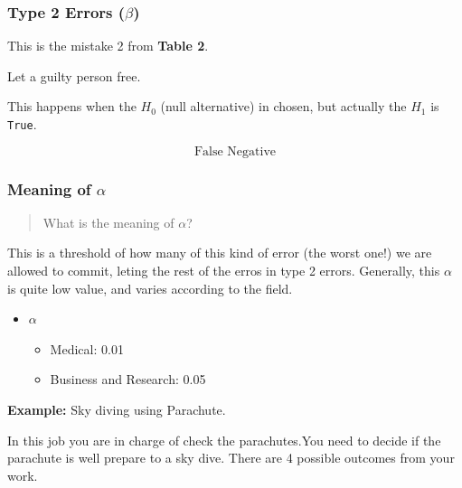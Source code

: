 \documentclass[]{book}
\providecommand{\tightlist}{%
  \setlength{\itemsep}{0pt}\setlength{\parskip}{0pt}}
\begin{document}
\subsubsection{\texorpdfstring{Type 2 Errors
(\(\beta\))}{Type 2 Errors (\textbackslash{}beta)}}\label{type-2-errors-beta}

This is the mistake 2 from \textbf{Table 2}.

Let a guilty person free.

This happens when the \(H_0\) (null alternative) in chosen, but actually
the \(H_1\) is \texttt{True}.

\[ \text{False Negative} \]

\subsubsection{\texorpdfstring{Meaning of
\(\alpha\)}{Meaning of \textbackslash{}alpha}}\label{meaning-of-alpha}

\begin{quote}
What is the meaning of \(\alpha\)?
\end{quote}

This is a threshold of how many of this kind of error (the worst one!)
we are allowed to commit, leting the rest of the erros in type 2 errors.
Generally, this \(\alpha\) is quite low value, and varies according to
the field.

\begin{itemize}
\tightlist
\item
  \(\alpha\)

  \begin{itemize}
  \tightlist
  \item
    Medical: 0.01
  \item
    Business and Research: 0.05
  \end{itemize}
\end{itemize}

\textbf{Example:} Sky diving using Parachute.

In this job you are in charge of check the parachutes.You need to decide
if the parachute is well prepare to a sky dive. There are 4 possible
outcomes from your work.
\end{document}
